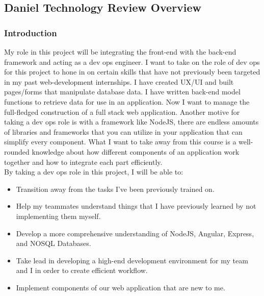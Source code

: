 \subsection{Daniel Technology Review Overview}
\subsubsection{Introduction}
My role in this project will be integrating the front-end with the back-end framework and acting as a dev ops engineer. I want to take on the role of dev ops for this project to hone in on certain skills that have not previously been targeted in my past web-development internships. I have created UX/UI and built pages/forms that  manipulate database data. I have written back-end model functions to retrieve data for use in an application. Now I want to manage the full-fledged construction of a full stack web application. Another motive for taking a dev ops role is with a framework like NodeJS, there are endless amounts of libraries and frameworks that you can utilize in your application that can simplify every component. What I want to take away from this course is a well-rounded knowledge about how different components of an application work together and how to integrate each part efficiently.\\
By taking a dev ops role in this project, I will be able to:
\begin{itemize}
    \item Transition away from the tasks I've been previously trained on.
    \item Help my teammates understand things that I have previously learned by not implementing them myself.
    \item Develop a more comprehensive understanding of NodeJS, Angular, Express, and NOSQL Databases.
    \item Take lead in developing a high-end development environment for my team and I in order to create efficient workflow.
    \item Implement components of our web application that are new to me.
\end{itemize}

